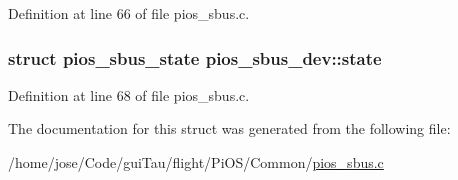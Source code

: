 Definition at line 66 of file pios\-\_\-sbus.\-c.

\hypertarget{structpios__sbus__dev_aeddc0c60e673c21f9c666cc8134935ee}{
\subsubsection[{state}]{\setlength{\rightskip}{0pt plus 5cm}struct {\bf pios\-\_\-sbus\-\_\-state} pios\-\_\-sbus\-\_\-dev\-::state}}\label{structpios__sbus__dev_aeddc0c60e673c21f9c666cc8134935ee}


Definition at line 68 of file pios\-\_\-sbus.\-c.



The documentation for this struct was generated from the following file\-:\begin{DoxyCompactItemize}
\item 
/home/jose/\-Code/gui\-Tau/flight/\-Pi\-O\-S/\-Common/\hyperlink{pios__sbus_8c}{pios\-\_\-sbus.\-c}\end{DoxyCompactItemize}

